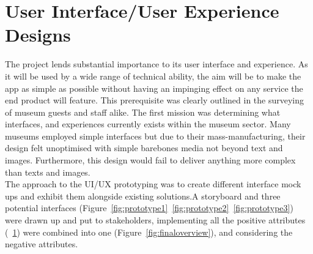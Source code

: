 \section{User Interface/User Experience Designs}
The project lends substantial importance to its user interface and experience. As it will be used by a wide range of technical ability, the aim will be to make the app as simple as possible without having an impinging effect on any service the end product will feature. This prerequisite was clearly outlined in the surveying of museum guests and staff alike. The first mission was determining what interfaces, and experiences currently exists within the museum sector. Many museums employed simple interfaces but due to their mass-manufacturing, their design felt unoptimised with simple barebones media not beyond text and images. Furthermore, this design would fail to deliver anything more complex than texts and images.\\
  
The approach to the UI/UX prototyping was to create different interface mock ups and exhibit them alongside existing solutions.A storyboard and three potential interfaces (Figure~\ref{fig:prototype1}~\ref{fig:prototype2}~\ref{fig:prototype3}) were drawn up and put to stakeholders, implementing all the positive attributes (~\ref{}) were combined into one (Figure~\ref{fig:finaloverview}), and considering the negative attributes.